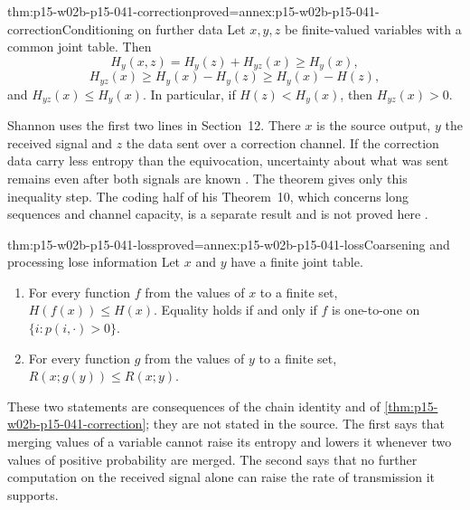\begin{hbtheorem}{thm:p15-w02b-p15-041-correction}{proved=annex:p15-w02b-p15-041-correction}{Conditioning on further data}
Let \(x,y,z\) be finite-valued variables with a common joint table.
Then
\[
 H_y(x,z)=H_y(z)+H_{yz}(x)\geq H_y(x),
\]
\[
 H_{yz}(x)\geq H_y(x)-H_y(z)\geq H_y(x)-H(z),
\]
and \(H_{yz}(x)\leq H_y(x)\).
In particular, if \(H(z)<H_y(x)\), then \(H_{yz}(x)>0\).
\end{hbtheorem}

Shannon uses the first two lines in Section~12. There \(x\) is the
source output, \(y\) the received signal and \(z\) the data sent over a
correction channel. If the correction data carry less entropy than the
equivocation, uncertainty about what was sent remains even after both
signals are known \cite[p.~21]{Shannon1948MathematicalTheory}. The
theorem gives only this inequality step. The coding half of his
Theorem~10, which concerns long sequences and channel capacity, is a
separate result and is not proved here
\cite[pp.~20--21]{Shannon1948MathematicalTheory}.

\begin{hbtheorem}{thm:p15-w02b-p15-041-loss}{proved=annex:p15-w02b-p15-041-loss}{Coarsening and processing lose information}
Let \(x\) and \(y\) have a finite joint table.
\begin{enumerate}
\item For every function \(f\) from the values of \(x\) to a finite
set, \(H(f(x))\leq H(x)\). Equality holds if and only if \(f\) is
one-to-one on \(\{i:p(i,\cdot)>0\}\).
\item For every function \(g\) from the values of \(y\) to a finite
set, \(R(x;g(y))\leq R(x;y)\).
\end{enumerate}
\end{hbtheorem}

These two statements are consequences of the chain identity and of
\cref{thm:p15-w02b-p15-041-correction}; they are not stated in the
source. The first says that merging values of a variable cannot raise
its entropy and lowers it whenever two values of positive probability
are merged. The second says that no further computation on the
received signal alone can raise the rate of transmission it supports.

